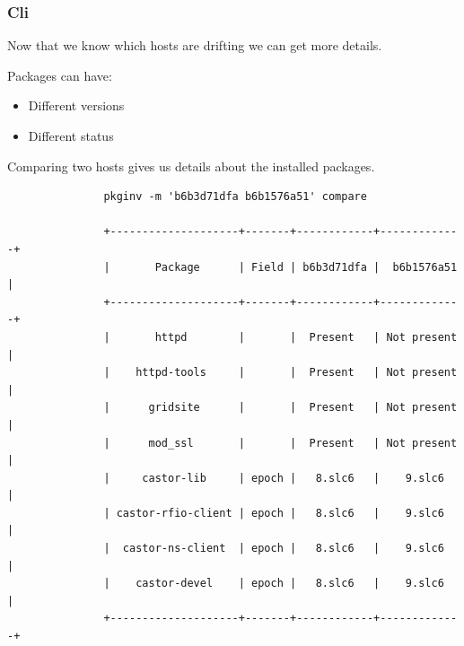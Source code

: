 \documentclass[aspectratio=169]{beamer}
\begin{document}

\begin{frame}[fragile]
    \frametitle{Cli}
    \begin{minipage}[t]{0.95\textwidth}

        Now that we know which hosts are drifting we can get more details.

        Packages can have:
        \begin{itemize}
            \item Different versions
            \item Different status
        \end{itemize}

        Comparing two hosts gives us details about the installed packages.
        \vspace{10px}
    \end{minipage}
    \vspace{\belowdisplayskip}
    \begin{minipage}[t]{0.95\textwidth}
        \centering
        \linespread{1px}
        \begin{verbatim}
               pkginv -m 'b6b3d71dfa b6b1576a51' compare

               +--------------------+-------+------------+-------------+
               |       Package      | Field | b6b3d71dfa |  b6b1576a51 |
               +--------------------+-------+------------+-------------+
               |       httpd        |       |  Present   | Not present |
               |    httpd-tools     |       |  Present   | Not present |
               |      gridsite      |       |  Present   | Not present |
               |      mod_ssl       |       |  Present   | Not present |
               |     castor-lib     | epoch |   8.slc6   |    9.slc6   |
               | castor-rfio-client | epoch |   8.slc6   |    9.slc6   |
               |  castor-ns-client  | epoch |   8.slc6   |    9.slc6   |
               |    castor-devel    | epoch |   8.slc6   |    9.slc6   |
               +--------------------+-------+------------+-------------+
        \end{verbatim}
    \end{minipage}
\end{frame}

\end{document}
